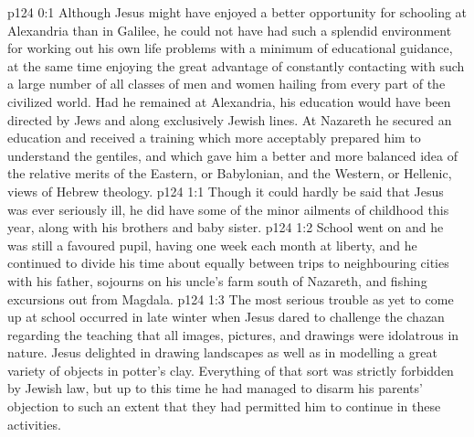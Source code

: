 \author{Midwayer Commission}
\vs p124 0:1 Although Jesus might have enjoyed a better opportunity for schooling at Alexandria than in Galilee, he could not have had such a splendid environment for working out his own life problems with a minimum of educational guidance, at the same time enjoying the great advantage of constantly contacting with such a large number of all classes of men and women hailing from every part of the civilized world. Had he remained at Alexandria, his education would have been directed by Jews and along exclusively Jewish lines. At Nazareth he secured an education and received a training which more acceptably prepared him to understand the gentiles, and which gave him a better and more balanced idea of the relative merits of the Eastern, or Babylonian, and the Western, or Hellenic, views of Hebrew theology.
\vs p124 1:1 Though it could hardly be said that Jesus was ever seriously ill, he did have some of the minor ailments of childhood this year, along with his brothers and baby sister.
\vs p124 1:2 School went on and he was still a favoured pupil, having one week each month at liberty, and he continued to divide his time about equally between trips to neighbouring cities with his father, sojourns on his uncle’s farm south of Nazareth, and fishing excursions out from Magdala.
\vs p124 1:3 \pc The most serious trouble as yet to come up at school occurred in late winter when Jesus dared to challenge the chazan regarding the teaching that all images, pictures, and drawings were idolatrous in nature. Jesus delighted in drawing landscapes as well as in modelling a great variety of objects in potter’s clay. Everything of that sort was strictly forbidden by Jewish law, but up to this time he had managed to disarm his parents’ objection to such an extent that they had permitted him to continue in these activities.
